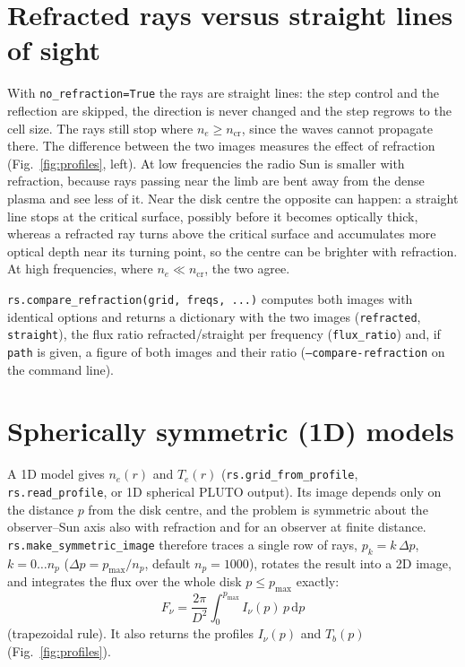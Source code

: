 \documentclass[11pt,a4paper]{article}
\newcommand{\code}[1]{\texttt{#1}}
\newcommand{\dd}{\mathrm{d}}
\newcommand{\ncr}{n_\mathrm{cr}}
\begin{document}
\section{Refracted rays versus straight lines of sight}\label{sec:compare}

With \code{no\_refraction=True} the rays are straight lines: the step control and the reflection
are skipped, the direction is never changed and the step regrows to the cell size. The rays still
stop where $n_e\ge\ncr$, since the waves cannot propagate there. The difference between the two
images measures the effect of refraction (Fig.~\ref{fig:profiles}, left). At low frequencies the
radio Sun is smaller with refraction, because rays passing near the limb are bent away from the
dense plasma and see less of it. Near the disk centre the opposite can happen: a straight line
stops at the critical surface, possibly before it becomes optically thick, whereas a refracted ray
turns above the critical surface and accumulates more optical depth near its turning point, so
the centre can be brighter with refraction. At high frequencies, where $n_e\ll\ncr$, the two
agree.

\code{rs.compare\_refraction(grid, freqs, ...)} computes both images with identical options and
returns a dictionary with the two images (\code{refracted}, \code{straight}), the flux ratio
refracted/straight per frequency (\code{flux\_ratio}) and, if \code{path} is given, a figure of
both images and their ratio
(\code{--compare-refraction} on the command line).

\section{Spherically symmetric (1D) models}\label{sec:sym}

A 1D model gives $n_e(r)$ and $T_e(r)$ (\code{rs.grid\_from\_profile}, \code{rs.read\_profile}, or
1D spherical PLUTO output). Its image depends only on the distance $p$ from the disk centre, and
the problem is symmetric about the observer--Sun axis also with refraction and for an observer at
finite distance. \code{rs.make\_symmetric\_image} therefore traces a single row of rays,
$p_k=k\,\Delta p$, $k=0\ldots n_p$ ($\Delta p=p_\text{max}/n_p$, default $n_p=1000$), rotates the
result into a 2D image, and integrates the flux over the whole disk $p\le p_\text{max}$ exactly:
\begin{equation}
  F_\nu=\frac{2\pi}{D^2}\int_0^{p_\text{max}}I_\nu(p)\,p\,\dd p
\end{equation}
(trapezoidal rule). It also returns the profiles $I_\nu(p)$ and $T_b(p)$
(Fig.~\ref{fig:profiles}).
\end{document}
